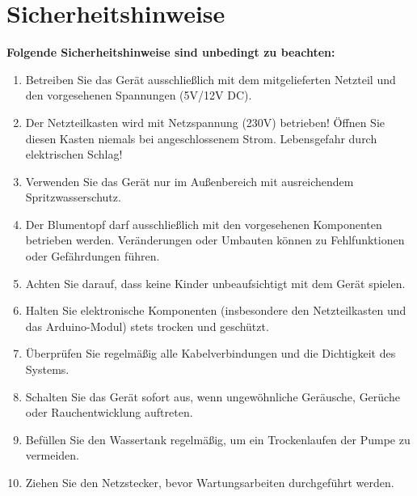 %
%

\chapter{Sicherheitshinweise}
\textbf{Folgende Sicherheitshinweise sind unbedingt zu beachten:}\\
\begin{enumerate}
	\item Betreiben Sie das Gerät ausschließlich mit dem mitgelieferten Netzteil und den vorgesehenen Spannungen (5V/12V DC).
	\item Der Netzteilkasten wird mit Netzspannung (230V) betrieben! Öffnen Sie diesen Kasten niemals bei angeschlossenem Strom. Lebensgefahr durch elektrischen Schlag!
	\item Verwenden Sie das Gerät nur im Außenbereich mit ausreichendem Spritzwasserschutz.
	\item Der Blumentopf darf ausschließlich mit den vorgesehenen Komponenten betrieben werden. Veränderungen oder Umbauten können zu Fehlfunktionen oder Gefährdungen führen.
	\item Achten Sie darauf, dass keine Kinder unbeaufsichtigt mit dem Gerät spielen.
	\item Halten Sie elektronische Komponenten (insbesondere den Netzteilkasten und das Arduino-Modul) stets trocken und geschützt.
	\item Überprüfen Sie regelmäßig alle Kabelverbindungen und die Dichtigkeit des Systems.
	\item Schalten Sie das Gerät sofort aus, wenn ungewöhnliche Geräusche, Gerüche oder Rauchentwicklung auftreten.
	\item Befüllen Sie den Wassertank regelmäßig, um ein Trockenlaufen der Pumpe zu vermeiden.
	\item Ziehen Sie den Netzstecker, bevor Wartungsarbeiten durchgeführt werden.
\end{enumerate}




